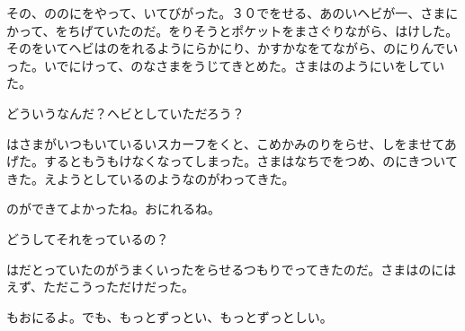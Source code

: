 その、ののにをやって、いてびがった。３０でをせる、あのいヘビが一、さまにかって、をちげていたのだ。をりそうとポケットをまさぐりながら、はけした。そのをいてヘビはのをれるようにらかにり、かすかなをてながら、のにりんでいった。いでにけって、のなさまをうじてきとめた。さまはのようにいをしていた。

どういうなんだ？ヘビとしていただろう？

はさまがいつもいているいスカーフをくと、こめかみのりをらせ、しをませてあげた。するともうもけなくなってしまった。さまはなちでをつめ、のにきついてきた。えようとしているのようなのがわってきた。

のができてよかったね。おにれるね。

どうしてそれをっているの？

はだとっていたのがうまくいったをらせるつもりでってきたのだ。さまはのにはえず、ただこうっただけだった。

もおにるよ。でも、もっとずっとい、もっとずっとしい。

